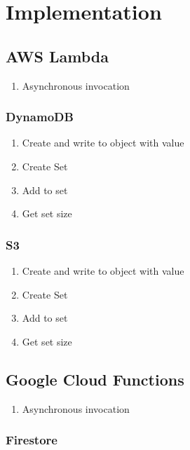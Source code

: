 \section{Implementation}\label{sec:impl}

\subsection{AWS Lambda}

\begin{enumerate}
  \item Asynchronous invocation
\end{enumerate}

\subsubsection{DynamoDB}

\begin{enumerate}
  \item Create and write to object with value
  \item Create Set
  \item Add to set
  \item Get set size
\end{enumerate}

\subsubsection{S3}

\begin{enumerate}
  \item Create and write to object with value
  \item Create Set
  \item Add to set
  \item Get set size
\end{enumerate}

\subsection{Google Cloud Functions}

\begin{enumerate}
  \item Asynchronous invocation
\end{enumerate}

\subsubsection{Firestore}

